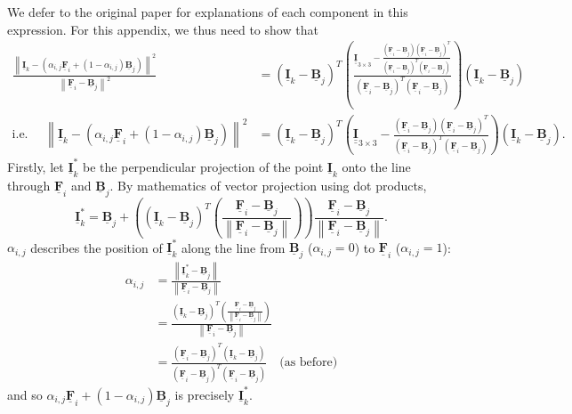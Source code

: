 \documentclass{article}
\theoremstyle{definition}
\def\vt#1{\underline{\mathbf{#1}}}
\def\mt#1{\underline{\underline{\mathbf{#1}}}}
\begin{document}
We defer to the original paper \cite{robust-matting} for explanations of each component in this expression. For this appendix, we thus need to show that
\begin{align*}
    \frac{\left\| \vt I_k - \left( \alpha_{i,j}\vt F_i + (1-\alpha_{i,j})\vt B_j\right)  \right\|^2}{\left\| \vt F_i - \vt B_j \right\|^2} &= \left(\vt I_k - \vt B_j \right)^T          \left( \frac{\mt I_{3\times 3} -  \frac{\left(\vt F_i - \vt B_j\right)\left(\vt F_i - \vt B_j\right)^T}{\left(\vt F_i - \vt B_j\right)^T\left(\vt F_i - \vt B_j\right)}}{\left(\vt F_i - \vt B_j\right)^T\left(\vt F_i - \vt B_j\right)}\right)     \left(\vt I_k - \vt B_j \right)  \\
    \text{i.e.\ }\quad\left\| \vt I_k - \left( \alpha_{i,j}\vt F_i + (1-\alpha_{i,j})\vt B_j\right)  \right\|^2 &= \left(\vt I_k - \vt B_j \right)^T          \left( \mt I_{3\times 3} -  \frac{\left(\vt F_i - \vt B_j\right)\left(\vt F_i - \vt B_j\right)^T}{\left(\vt F_i - \vt B_j\right)^T\left(\vt F_i - \vt B_j\right)}\right)     \left(\vt I_k - \vt B_j \right).
\end{align*}
Firstly, let $\vt I_k^*$ be the perpendicular projection of the point $\vt I_k$ onto the line through $\vt F_i$ and $\vt B_j$. By mathematics of vector projection using dot products,
$$\vt I_k^* = \vt B_j + \left( \left(\vt I_k - \vt B_j\right)^T \left( \frac{\vt F_i - \vt B_j}{\left\| \vt F_i - \vt B_j \right\|}\right) \right) \frac{\vt F_i - \vt B_j}{\left\| \vt F_i - \vt B_j \right\|}.$$
$\alpha_{i,j}$ describes the position of $\vt I_k^*$ along the line from $\vt B_j$ ($\alpha_{i,j}=0$) to $\vt F_i$ ($\alpha_{i,j}=1$):
\begin{align*}
    \alpha_{i,j} &= \frac{\left\| \vt I_k^* - \vt B_j  \right\|}{\left\| \vt F_i - \vt B_j  \right\|}\\
    &= \frac{\left(\vt I_k - \vt B_j\right)^T \left( \frac{\vt F_i - \vt B_j}{\left\| \vt F_i - \vt B_j \right\|}\right)}{\left\| \vt F_i - \vt B_j  \right\|}\\
    &=\frac{\left(\vt F_i - \vt B_j\right)^T\left(\vt I_k - \vt B_j\right)}{\left(\vt F_i - \vt B_j\right)^T\left(\vt F_i - \vt B_j\right)}  \quad\text{(as before)}
\end{align*}
and so $\alpha_{i,j}\vt F_i + (1-\alpha_{i,j})\vt B_j$ is precisely $\vt I_k^*$.
\end{document}
